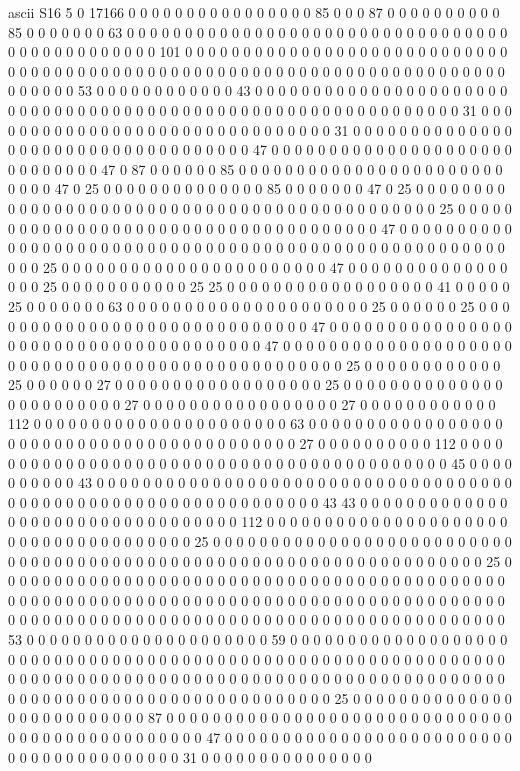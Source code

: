ascii
S16
5
0 17166 0 0 0 0 0 0 0 0 0 0 0 0 0 0 0 0 85 0 0 0 87 0 0 0 0 0 0 0 0 0 0 85 0 0 0 0 0 0 0 63 0 0 0 0 0 0 0 0 0 0 0 0 0 0 0 0 0 0 0 0 0 0 0 0 0 0 0 0 0 0 0 0 0 0 0 0 0 0 0 0 0 0 0 0 0 0 101 0 0 0 0 0 0 0 0 0 0 0 0 0 0 0 0 0 0 0 0 0 0 0 0 0 0 0 0 0 0 0 0 0 0 0 0 0 0 0 0 0 0 0 0 0 0 0 0 0 0 0 0 0 0 0 0 0 0 0 0 0 0 0 0 0 0 0 0 0 0 0 0 0 0 0 0 0 53 0 0 0 0 0 0 0 0 0 0 0 0 43 0 0 0 0 0 0 0 0 0 0 0 0 0 0 0 0 0 0 0 0 0 0 0 0 0 0 0 0 0 0 0 0 0 0 0 0 0 0 0 0 0 0 0 0 0 0 0 0 0 0 0 0 0 0 0 0 0 0 0 0 0 31 0 0 0 0 0 0 0 0 0 0 0 0 0 0 0 0 0 0 0 0 0 0 0 0 0 0 0 0 0 0 0 31 0 0 0 0 0 0 0 0 0 0 0 0 0 0 0 0 0 0 0 0 0 0 0 0 0 0 0 0 0 0 0 0 0 0 0 47 0 0 0 0 0 0 0 0 0 0 0 0 0 0 0 0 0 0 0 0 0 0 0 0 0 0 0 0 0 47 0 87 0 0 0 0 0 0 85 0 0 0 0 0 0 0 0 0 0 0 0 0 0 0 0 0 0 0 0 0 0 0 0 0 0 0 47 0 25 0 0 0 0 0 0 0 0 0 0 0 0 0 0 85 0 0 0 0 0 0 0 47 0 25 0 0 0 0 0 0 0 0 0 0 0 0 0 0 0 0 0 0 0 0 0 0 0 0 0 0 0 0 0 0 0 0 0 0 0 0 0 0 0 0 0 0 0 0 0 25 0 0 0 0 0 0 0 0 0 0 0 0 0 0 0 0 0 0 0 0 0 0 0 0 0 0 0 0 0 0 0 0 0 0 0 0 0 47 0 0 0 0 0 0 0 0 0 0 0 0 0 0 0 0 0 0 0 0 0 0 0 0 0 0 0 0 0 0 0 0 0 0 0 0 0 0 0 0 0 0 0 0 0 0 0 0 0 0 0 0 0 0 0 0 25 0 0 0 0 0 0 0 0 0 0 0 0 0 0 0 0 0 0 0 0 0 0 0 47 0 0 0 0 0 0 0 0 0 0 0 0 0 0 0 0 0 25 0 0 0 0 0 0 0 0 0 0 0 25 25 0 0 0 0 0 0 0 0 0 0 0 0 0 0 0 0 0 0 41 0 0 0 0 0 25 0 0 0 0 0 0 0 63 0 0 0 0 0 0 0 0 0 0 0 0 0 0 0 0 0 0 0 0 0 25 0 0 0 0 0 0 25 0 0 0 0 0 0 0 0 0 0 0 0 0 0 0 0 0 0 0 0 0 0 0 0 0 0 0 0 0 47 0 0 0 0 0 0 0 0 0 0 0 0 0 0 0 0 0 0 0 0 0 0 0 0 0 0 0 0 0 0 0 0 0 0 0 0 0 0 47 0 0 0 0 0 0 0 0 0 0 0 0 0 0 0 0 0 0 0 0 0 0 0 0 0 0 0 0 0 0 0 0 0 0 0 0 0 0 0 0 0 0 0 0 0 0 0 0 0 25 0 0 0 0 0 0 0 0 0 0 0 0 25 0 0 0 0 0 0 27 0 0 0 0 0 0 0 0 0 0 0 0 0 0 0 0 0 0 25 0 0 0 0 0 0 0 0 0 0 0 0 0 0 0 0 0 0 0 0 0 0 0 0 27 0 0 0 0 0 0 0 0 0 0 0 0 0 0 0 0 0 27 0 0 0 0 0 0 0 0 0 0 0 0 112 0 0 0 0 0 0 0 0 0 0 0 0 0 0 0 0 0 0 0 0 0 0 63 0 0 0 0 0 0 0 0 0 0 0 0 0 0 0 0 0 0 0 0 0 0 0 0 0 0 0 0 0 0 0 0 0 0 0 0 0 0 0 0 0 0 27 0 0 0 0 0 0 0 0 0 0 112 0 0 0 0 0 0 0 0 0 0 0 0 0 0 0 0 0 0 0 0 0 0 0 0 0 0 0 0 0 0 0 0 0 0 0 0 0 0 0 0 0 0 45 0 0 0 0 0 0 0 0 0 0 43 0 0 0 0 0 0 0 0 0 0 0 0 0 0 0 0 0 0 0 0 0 0 0 0 0 0 0 0 0 0 0 0 0 0 0 0 0 0 0 0 0 0 0 0 0 0 0 0 0 0 0 0 0 0 0 0 0 0 0 0 0 0 0 43 43 0 0 0 0 0 0 0 0 0 0 0 0 0 0 0 0 0 0 0 0 0 0 0 0 0 0 0 0 0 0 0 0 0 112 0 0 0 0 0 0 0 0 0 0 0 0 0 0 0 0 0 0 0 0 0 0 0 0 0 0 0 0 0 0 0 0 0 0 0 0 0 25 0 0 0 0 0 0 0 0 0 0 0 0 0 0 0 0 0 0 0 0 0 0 0 0 0 0 0 0 0 0 0 0 0 0 0 0 0 0 0 0 0 0 0 0 0 0 0 0 0 0 0 0 0 0 0 0 0 0 0 0 0 0 0 0 0 0 0 25 0 0 0 0 0 0 0 0 0 0 0 0 0 0 0 0 0 0 0 0 0 0 0 0 0 0 0 0 0 0 0 0 0 0 0 0 0 0 0 0 0 0 0 0 0 0 0 0 0 0 0 0 0 0 0 0 0 0 0 0 0 0 0 0 0 0 0 0 0 0 0 0 0 0 0 0 0 0 0 0 0 0 0 0 0 0 0 0 0 0 0 0 0 0 0 0 0 0 0 0 0 0 0 0 0 0 0 0 0 0 0 0 0 0 0 0 0 0 0 0 0 0 0 0 0 0 0 0 0 0 53 0 0 0 0 0 0 0 0 0 0 0 0 0 0 0 0 0 0 0 0 0 59 0 0 0 0 0 0 0 0 0 0 0 0 0 0 0 0 0 0 0 0 0 0 0 0 0 0 0 0 0 0 0 0 0 0 0 0 0 0 0 0 0 0 0 0 0 0 0 0 0 0 0 0 0 0 0 0 0 0 0 0 0 0 0 0 0 0 0 0 0 0 0 0 0 0 0 0 0 0 0 0 0 0 0 0 0 0 0 0 0 0 0 0 0 0 0 0 0 0 0 0 0 0 0 0 0 0 0 0 0 0 0 0 0 0 0 0 0 0 0 0 0 0 0 0 0 0 0 0 0 0 0 0 0 25 0 0 0 0 0 0 0 0 0 0 0 0 0 0 0 0 0 0 0 0 0 0 0 0 0 0 87 0 0 0 0 0 0 0 0 0 0 0 0 0 0 0 0 0 0 0 0 0 0 0 0 0 0 0 0 0 0 0 0 0 0 0 0 0 0 0 0 0 0 0 0 0 0 0 47 0 0 0 0 0 0 0 0 0 0 0 0 0 0 0 0 0 0 0 0 0 0 0 0 0 0 0 0 0 0 0 0 0 0 0 0 0 0 0 0 31 0 0 0 0 0 0 0 0 0 0 0 0 0 0 0 